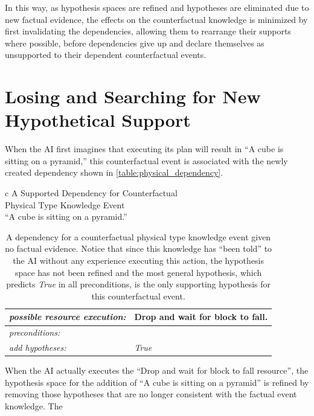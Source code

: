 In this way, as hypothesis spaces are refined and hypotheses are
eliminated due to new factual evidence, the effects on the
counterfactual knowledge is minimized by first invalidating the
dependencies, allowing them to rearrange their supports where
possible, before dependencies give up and declare themselves as
unsupported to their dependent counterfactual events.

\section{Losing and Searching for New Hypothetical Support}

When the AI first imagines that executing its plan will result in ``A
cube is sitting on a pyramid,'' this counterfactual event is
associated with the newly created dependency shown in
{\mbox{\autoref{table:physical_dependency}}}.
\begin{table}[h]
\centering
\begin{tabular}{c}
  A Supported Dependency for Counterfactual \\
  Physical Type Knowledge Event \\
  ``A cube is sitting on a pyramid.'' \\
  \begin{tabular}{|p{3cm}|p{6cm}|}
    \hline
    \emph{possible resource execution:} & Drop and wait for block to fall. \\
    \hline
    \emph{preconditions:}               & \\
    \hline
    \emph{add hypotheses:}              & \emph{True} \\
    \hline
  \end{tabular}
\end{tabular}
\caption[A dependency for a counterfactual physical type knowledge
  event given no factual evidence.]{A dependency for a counterfactual
  physical type knowledge event given no factual evidence.  Notice
  that since this knowledge has ``been told'' to the AI without any
  experience executing this action, the hypothesis space has not been
  refined and the most general hypothesis, which predicts \emph{True}
  in all preconditions, is the only supporting hypothesis for this
  counterfactual event.}
\label{table:physical_dependency}
\end{table}
When the AI actually executes the ``Drop and wait for block to fall
resource'', the hypothesis space for the addition of ``A cube is
sitting on a pyramid'' is refined by removing those hypotheses that
are no longer consistent with the factual event knowledge.  The
